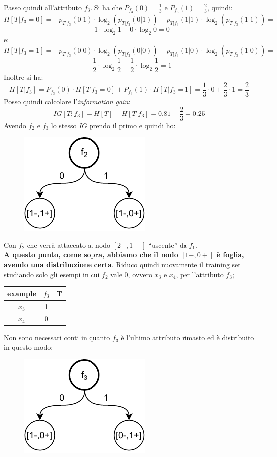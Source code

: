 \begin{esempio}
  Passo quindi all'attributo $f_3$. Si ha che $P_{f_3}(0)=\frac{1}{3}$ e
  $P_{f_3}(1)=\frac{2}{3}$, quindi:
  \[H[T|f_3=0]=-p_{T|f_3}(0|1)\cdot \log_2(p_{T|f_3}(0|1))-p_{T|f_3}(1|1)\cdot
    \log_2(p_{T|f_3}(1|1))=\]
  \[-1\cdot \log_2 1-0\cdot \log_2 0=0\]
  e:
  \[H[T|f_3=1]=-p_{T|f_3}(0|0)\cdot \log_2(p_{T|f_3}(0|0))-p_{T|f_3}(1|0)\cdot
    \log_2(p_{T|f_3}(1|0))=\]
  \[-\frac{1}{2}\cdot \log_2 \frac{1}{2}-\frac{1}{2}\cdot \log_2 \frac{1}{2}=1\]
  Inoltre si ha:
  \[H[T|f_3]=P_{f_3}(0)\cdot H[T|f_3=0]+P_{f_3}(1)\cdot
    H[T|f_3=1]=\frac{1}{3}\cdot 0+\frac{2}{3}\cdot 1=\frac{2}{3}\]
  Posso quindi calcolare l'\textit{information gain}:
  \[IG[T;f_3]=H[T]-H[T|f_3]=0.81-\frac{2}{3}=0.25\]
  Avendo $f_2$ e $f_3$ lo stesso $IG$ prendo il primo e quindi ho:
  \begin{figure}[H]
    \centering
    \includegraphics[scale = 0.9]{img/id6.pdf}
  \end{figure}
  Con $f_2$ che verrà attaccato al nodo $[2-, 1+]$ ``uscente'' da $f_1$.\\
 \textbf{ A questo punto, come sopra, abbiamo che il nodo $[1-, 0+]$ è foglia, avendo una
  distribuzione certa}. Riduco quindi nuovamente il training set studiando solo
  gli esempi in cui $f_2$ vale 0, ovvero $x_3$ e $x_4$, per l'attributo $f_3$;
  \begin{table}[H]
    \centering
    \begin{tabular}{c|c|c}
      example & $f_3$ & T\\
      \hline
      $x_3$ & 1 & \color{darkgreen}{1}\\
      $x_4$ & 0 & \color{red}{0}\\
    \end{tabular}
  \end{table}
  \newpage
  Non sono necessari conti in quanto $f_3$ è l'ultimo attributo rimasto ed è
  distribuito in questo modo:
  \begin{figure}[H]
    \centering
    \includegraphics[scale = 0.9]{img/id7.pdf}

\end{figure}
\end{esempio}
